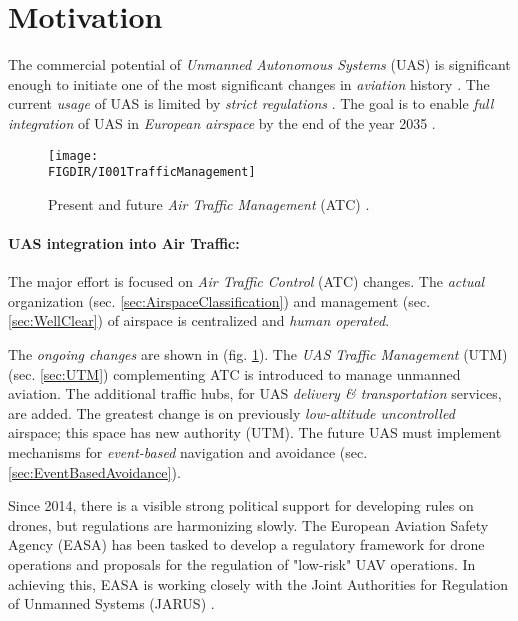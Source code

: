 \section{Motivation}\label{s:motivation}
\noindent The commercial potential of \emph{Unmanned Autonomous Systems} (UAS) is significant  enough to initiate one of the most significant changes in \emph{aviation} history \cite{airbusUTM2018blueprint}. The current \emph{usage} of UAS is limited by \emph{strict regulations} \cite{icao4444,icaoAnnex2,icaoAnnex11}. The goal is to enable \emph{full integration} of UAS in \emph{European airspace} by the end of the year 2035 \cite{eurocontrol2018rpasatm}.


\begin{figure}[H]
    \centering
    \texttt{[image: \\FIGDIR/I001TrafficManagement]}
    \caption{Present and future \emph{Air Traffic Management} (ATC) \cite{airbusUTM2018blueprint}.}
    \label{fig:airTrafficManagementEvolution}
\end{figure}

\paragraph{UAS integration into Air Traffic:} The major effort is focused on \emph{Air Traffic Control} (ATC) changes. The \emph{actual} organization (sec. \ref{sec:AirspaceClassification}) and management (sec. \ref{sec:WellClear}) of airspace is centralized and \emph{human operated}.  

The \emph{ongoing changes} are shown in (fig. \ref{fig:airTrafficManagementEvolution}). The \emph{UAS Traffic Management} (UTM) (sec. \ref{sec:UTM}) complementing ATC is introduced to manage unmanned aviation. The additional traffic hubs, for UAS \emph{delivery \& transportation} services, are added. The greatest change is on previously \emph{low-altitude uncontrolled} airspace; this space has new authority (UTM). The future UAS must implement mechanisms for \emph{event-based} navigation and avoidance (sec. \ref{sec:EventBasedAvoidance}).

Since 2014, there is a visible strong political support for developing rules on drones, but regulations are harmonizing slowly. The European Aviation Safety Agency (EASA) has been tasked to develop a regulatory framework for drone operations and proposals for the regulation of "low-risk" UAV operations. In achieving this, EASA is working closely with the Joint Authorities for Regulation of Unmanned Systems (JARUS) \cite{jarus2016regulations}.

